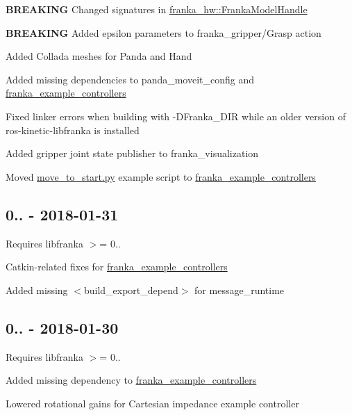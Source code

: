 \begin{DoxyItemize}
\item {\bfseries B\+R\+E\+A\+K\+I\+NG} Changed signatures in {\ttfamily \hyperlink{classfranka__hw_1_1FrankaModelHandle}{franka\+\_\+hw\+::\+Franka\+Model\+Handle}}
\item {\bfseries B\+R\+E\+A\+K\+I\+NG} Added epsilon parameters to {\ttfamily franka\+\_\+gripper/\+Grasp} action
\item Added Collada meshes for Panda and Hand
\item Added missing dependencies to {\ttfamily panda\+\_\+moveit\+\_\+config} and {\ttfamily \hyperlink{namespacefranka__example__controllers}{franka\+\_\+example\+\_\+controllers}}
\item Fixed linker errors when building with {\ttfamily -\/\+D\+Franka\+\_\+\+D\+IR} while an older version of {\ttfamily ros-\/kinetic-\/libfranka} is installed
\item Added gripper joint state publisher to {\ttfamily franka\+\_\+visualization}
\item Moved {\ttfamily \hyperlink{move__to__start_8py}{move\+\_\+to\+\_\+start.\+py}} example script to {\ttfamily \hyperlink{namespacefranka__example__controllers}{franka\+\_\+example\+\_\+controllers}}
\end{DoxyItemize}

\subsection*{0.. -\/ 2018-\/01-\/31}

Requires {\ttfamily libfranka} $>$= 0..


\begin{DoxyItemize}
\item Catkin-\/related fixes for {\ttfamily \hyperlink{namespacefranka__example__controllers}{franka\+\_\+example\+\_\+controllers}}
\item Added missing {\ttfamily $<$build\+\_\+export\+\_\+depend$>$} for {\ttfamily message\+\_\+runtime}
\end{DoxyItemize}

\subsection*{0.. -\/ 2018-\/01-\/30}

Requires {\ttfamily libfranka} $>$= 0..


\begin{DoxyItemize}
\item Added missing dependency to {\ttfamily \hyperlink{namespacefranka__example__controllers}{franka\+\_\+example\+\_\+controllers}}
\item Lowered rotational gains for Cartesian impedance example controller
\end{DoxyItemize}


